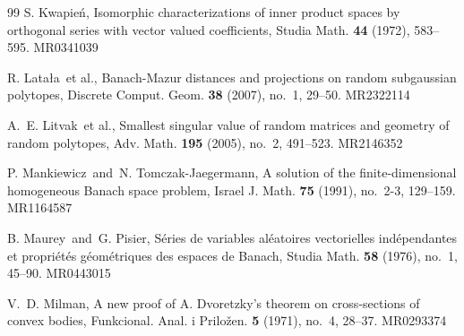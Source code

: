\documentclass[11pt]{amsart}
\theoremstyle{definition}
\theoremstyle{plain}
\begin{document}
\begin{thebibliography}{99}
{
S. Kwapie\'{n}, Isomorphic characterizations of inner product spaces by orthogonal series with vector valued coefficients, Studia Math. {\bf 44} (1972), 583--595. MR0341039
}

{
R. Lata\l a\ et al., Banach-Mazur distances and projections on random subgaussian polytopes, Discrete Comput. Geom. {\bf 38} (2007), no.~1, 29--50. MR2322114
}




{
A.~E. Litvak\ et al., Smallest singular value of random matrices and geometry of random polytopes, Adv. Math. {\bf 195} (2005), no.~2, 491--523. MR2146352
}

{
P. Mankiewicz\ and\ N. Tomczak-Jaegermann, A solution of the finite-dimensional homogeneous Banach space problem, Israel J. Math. {\bf 75} (1991), no.~2-3, 129--159. MR1164587
}



{
B. Maurey\ and\ G. Pisier, S\'{e}ries de variables al\'{e}atoires vectorielles ind\'{e}pendantes et propri\'{e}t\'{e}s g\'{e}om\'{e}triques des espaces de Banach, Studia Math. {\bf 58} (1976), no.~1, 45--90. MR0443015
}



{
V.~D. Milman, A new proof of A. Dvoretzky's theorem on cross-sections of convex bodies, Funkcional. Anal. i Prilo\v{z}en. {\bf 5} (1971), no.~4, 28--37. MR0293374
}


\end{thebibliography}
\end{document}
